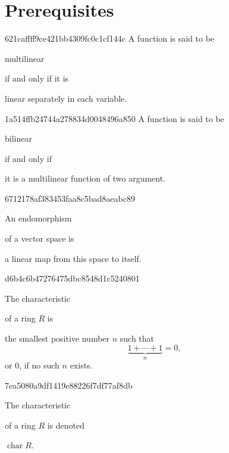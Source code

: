


\section{Prerequisites}
\begin{note}{621caffff9ce421bb4309fc0c1cf144c}
    A function is said to be \begin{icloze}{2}multilinear\end{icloze} if and only if it is \begin{icloze}{1}linear separately in each variable.\end{icloze}
\end{note}

\begin{note}{1a514ffb24744a278834d0048496a850}
    A function is said to be \begin{icloze}{2}bilinear\end{icloze} if and only if \begin{icloze}{1}it is a multilinear function of two argument.\end{icloze}
\end{note}

\begin{note}{6712178af383453faa8c5bad8aeabc89}
    \begin{icloze}{2}An endomorphism\end{icloze} of a vector space is \begin{icloze}{1}a linear map from this space to itself.\end{icloze}
\end{note}

\begin{note}{d6b4c6b47276475dbc8548d1c5240801}
    \begin{icloze}{2}The characteristic\end{icloze} of a ring \( R \) is \begin{icloze}{1}the smallest positive number \( n \) such that
    \[
        \underbrace{1 + \cdots + 1}_{n} = 0,
    \]
    or \( 0 \), if no such \( n \) exists.
    \end{icloze}
\end{note}

\begin{note}{7ea5080a9df1419e88226f7df77af8db}
\begin{icloze}{1}The characteristic\end{icloze} of a ring \( R \) is denoted \begin{icloze}{2}\( \operatorname{char} R \).\end{icloze}
\end{note}

